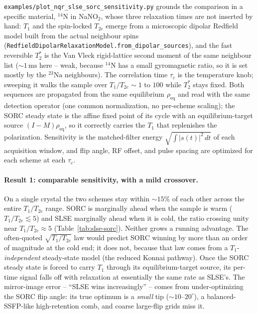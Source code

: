 \documentclass[11pt,oneside]{report}
\newcommand{\code}[1]{\texttt{#1}}
\begin{document}
\code{examples/plot\_nqr\_slse\_sorc\_sensitivity.py} grounds the comparison in a
specific material, \({}^{14}\mathrm{N}\) in NaNO\(_2\), whose three relaxation
times are not inserted by hand: \(T_1\) and the spin-locked \(T_{2e}\) emerge from
a microscopic dipolar Redfield model built from the actual neighbour spins
(\code{RedfieldDipolarRelaxationModel.from\_dipolar\_sources}), and the fast
reversible \(T_2^\ast\) is the Van Vleck rigid-lattice second moment of the same
neighbour list (\(\sim 1\,\mathrm{ms}\) here -- weak, because \({}^{14}\mathrm{N}\)
has a small gyromagnetic ratio, so it is set mostly by the \({}^{23}\mathrm{Na}\)
neighbours). The correlation time \(\tau_c\) is the temperature knob; sweeping it
walks the sample over \(T_1/T_{2e}\sim 1\) to \(100\) while \(T_2^\ast\) stays
fixed. Both sequences are propagated from the same equilibrium \(\rho_{\mathrm{eq}}\)
and read with the same detection operator (one common normalization, no
per-scheme scaling); the SORC steady state is the affine fixed point of its cycle
with an equilibrium-target source \((I-M)\rho_{\mathrm{eq}}\), so it correctly
carries the \(T_1\) that replenishes the polarization. Sensitivity is the
matched-filter energy \(\sqrt{\int|s(t)|^2\,dt}\) of each acquisition window, and
flip angle, RF offset, and pulse spacing are optimized for each scheme at each
\(\tau_c\).

\paragraph{Result 1: comparable sensitivity, with a mild crossover.}
On a single crystal the two schemes stay within \(\sim 15\%\) of each other across
the entire \(T_1/T_{2e}\) range. SORC is marginally ahead when the sample is warm
(\(T_1/T_{2e}\lesssim 5\)) and SLSE marginally ahead when it is cold, the ratio
crossing unity near \(T_1/T_{2e}\approx 5\) (Table~\ref{tab:slse-sorc}). Neither
grows a running advantage. The often-quoted \(\sqrt{T_1/T_{2e}}\) law would predict
SORC winning by more than an order of magnitude at the cold end; it does not,
because that law comes from a \(T_1\)-\emph{independent} steady-state model (the
reduced Konnai pathway). Once the SORC steady state is forced to carry \(T_1\)
through its equilibrium-target source, its per-time signal falls off with
relaxation at essentially the same rate as SLSE's. The mirror-image error --
``SLSE wins increasingly'' -- comes from under-optimizing the SORC flip angle: its
true optimum is a \emph{small} tip (\(\sim 10\text{--}20^\circ\)), a
balanced-SSFP-like high-retention comb, and coarse large-flip grids miss it.
\end{document}

